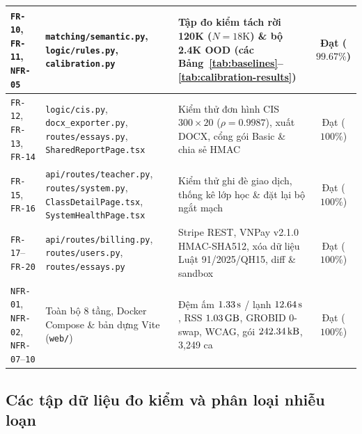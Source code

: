 {\begin{longtable}{|L{0.19}|L{0.33}|L{0.34}|C{0.14}|}
\hline
\texttt{FR-10}, \texttt{FR-11}, \texttt{NFR-05} & \texttt{matching/\allowbreak{}semantic.py}, \texttt{logic/\allowbreak{}rules.py}, \texttt{calibration.py} & Tập đo kiểm tách rời 120K ($N=18\text{K}$) \& bộ 2.4K OOD (các Bảng~\ref{tab:baselines}--\ref{tab:calibration-results}) & Đạt ($99.67\%$) \\
\hline
\texttt{FR-12}, \texttt{FR-13}, \texttt{FR-14} & \texttt{logic/\allowbreak{}cis.py}, \texttt{docx\_exporter.py}, \texttt{routes/\allowbreak{}essays.py}, \texttt{SharedReportPage.tsx} & Kiểm thử đơn hình CIS $300 \times 20$ ($\rho = 0.9987$), xuất DOCX, cổng gói Basic \& chia sẻ HMAC & Đạt ($100\%$) \\
\hline
\texttt{FR-15}, \texttt{FR-16} & \texttt{api/\allowbreak{}routes/\allowbreak{}teacher.py}, \texttt{routes/\allowbreak{}system.py}, \texttt{ClassDetailPage.tsx}, \texttt{SystemHealthPage.tsx} & Kiểm thử ghi đè giao dịch, thống kê lớp học \& đặt lại bộ ngắt mạch & Đạt ($100\%$) \\
\hline
\texttt{FR-17}--\texttt{FR-20} & \texttt{api/\allowbreak{}routes/\allowbreak{}billing.py}, \texttt{routes/\allowbreak{}users.py}, \texttt{routes/\allowbreak{}essays.py} & Stripe REST, VNPay v2.1.0 HMAC-SHA512, xóa dữ liệu Luật 91/2025/QH15, diff \& sandbox & Đạt ($100\%$) \\
\hline
\texttt{NFR-01}, \texttt{NFR-02}, \texttt{NFR-07}--\texttt{10} & Toàn bộ 8 tầng, Docker Compose \& bản dựng Vite (\texttt{web/}) & Đệm ấm $1.33\text{\,s}$ / lạnh $12.64\text{\,s}$, RSS $1.03\text{\,GB}$, GROBID 0-swap, WCAG, gói $242.34\text{\,kB}$, 3,249 ca & Đạt ($100\%$) \\
\hline
\end{longtable}
}

\subsection{Các tập dữ liệu đo kiểm và phân loại nhiễu loạn}

